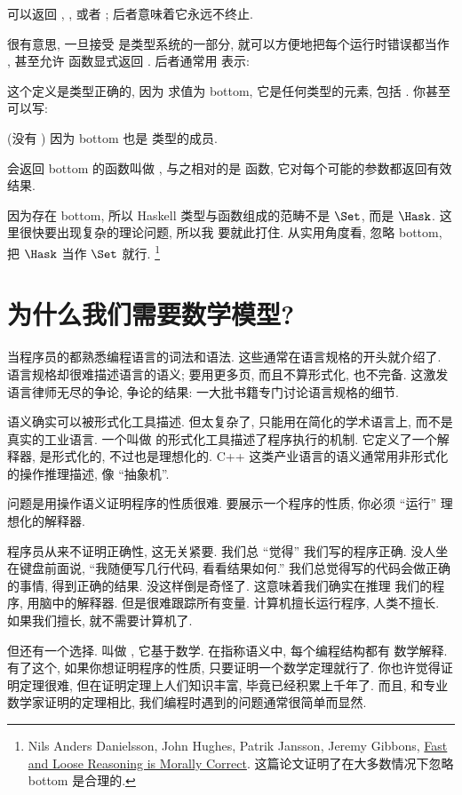 可以返回 , , 或者 \code{\_|\_}; 后者意味着它永远不终止.

很有意思, 一旦接受 \code{\_|\_} 是类型系统的一部分, 就可以方便地把每个运行时错误都当作 \code{\_|\_}, 甚至允许
函数显式返回 \code{\_|\_}. 后者通常用  表示:

这个定义是类型正确的, 因为  求值为 bottom, 它是任何类型的元素, 包括 . 你甚至可以写:

(没有 ) 因为 bottom 也是  类型的成员.

会返回 bottom 的函数叫做 , 与之相对的是  函数, 它对每个可能的参数都返回有效结果.

因为存在 bottom, 所以 Haskell 类型与函数组成的范畴不是 $\Set$, 而是 $\Hask$. 这里很快要出现复杂的理论问题, 所以我
要就此打住. 从实用角度看, 忽略 bottom, 把 $\Hask$ 当作 $\Set$ 就行. \footnote{Nils Anders Danielsson,
  John Hughes, Patrik Jansson, Jeremy Gibbons, \href{http://www.cs.ox.ac.uk/jeremy.gibbons/publications/fast+loose.pdf}{
    Fast and Loose Reasoning is Morally Correct}. 这篇论文证明了在大多数情况下忽略 bottom 是合理的.}

\section{为什么我们需要数学模型?}

当程序员的都熟悉编程语言的词法和语法. 这些通常在语言规格的开头就介绍了. 语言规格却很难描述语言的语义; 要用更多页,
而且不算形式化, 也不完备. 这激发语言律师无尽的争论, 争论的结果: 一大批书籍专门讨论语言规格的细节.

语义确实可以被形式化工具描述. 但太复杂了, 只能用在简化的学术语言上, 而不是真实的工业语言. 一个叫做
 的形式化工具描述了程序执行的机制. 它定义了一个解释器,
是形式化的, 不过也是理想化的. C++ 这类产业语言的语义通常用非形式化的操作推理描述, 像 ``抽象机''.

问题是用操作语义证明程序的性质很难. 要展示一个程序的性质, 你必须 ``运行'' 理想化的解释器.

程序员从来不证明正确性, 这无关紧要. 我们总 ``觉得'' 我们写的程序正确. 没人坐在键盘前面说, ``我随便写几行代码,
看看结果如何.'' 我们总觉得写的代码会做正确的事情, 得到正确的结果. 没这样倒是奇怪了. 这意味着我们确实在推理
我们的程序, 用脑中的解释器. 但是很难跟踪所有变量. 计算机擅长运行程序, 人类不擅长. 如果我们擅长, 就不需要计算机了.

但还有一个选择. 叫做 , 它基于数学. 在指称语义中, 每个编程结构都有
数学解释. 有了这个, 如果你想证明程序的性质, 只要证明一个数学定理就行了. 你也许觉得证明定理很难, 但在证明定理上人们知识丰富,
毕竟已经积累上千年了. 而且, 和专业数学家证明的定理相比, 我们编程时遇到的问题通常很简单而显然.

